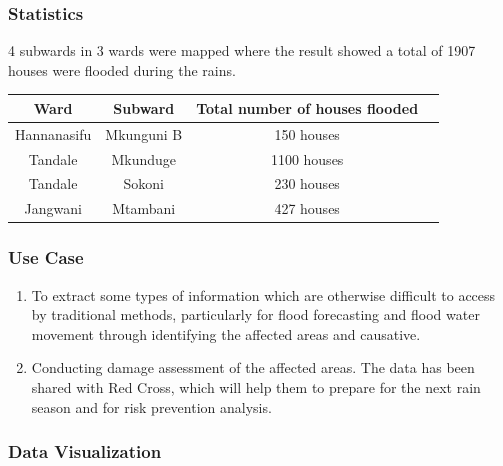 \documentclass[a4paper,12pt,twoside]{article}
\begin{document}
\subsubsection{Statistics}
4 subwards in 3 wards were mapped where the result showed a total of 1907 houses were flooded during the rains.
\begin{center}
\begin{tabular}{|c|c|c|c|}
\hline
\bfseries Ward & \bfseries Subward & \bfseries Total number of houses flooded \\
\hline
Hannanasifu & Mkunguni B & 150 houses \\
\hline
Tandale & Mkunduge & 1100 houses \\
\hline
Tandale & Sokoni & 230 houses \\
\hline
Jangwani & Mtambani & 427 houses \\
\hline
\end{tabular}
\end{center}

\subsubsection{Use Case}
\begin{enumerate}
    \item To extract some types of information which are otherwise difficult to access by traditional methods, particularly for flood forecasting and flood water movement through identifying the affected areas and causative.
    \item Conducting damage assessment of the affected areas. The data has been shared with Red Cross, which will help them to prepare for the next rain season and for risk prevention analysis.
\end{enumerate}

\subsubsection{Data Visualization}
\end{document}
